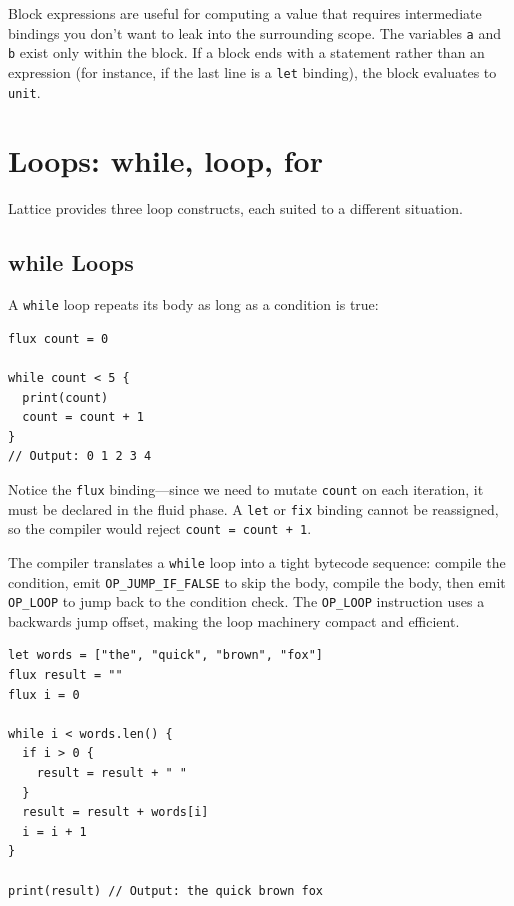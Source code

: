Block expressions are useful for computing a value that requires intermediate bindings you don't want to leak into the surrounding scope. The variables \lstinline|a| and \lstinline|b| exist only within the block. If a block ends with a statement rather than an expression (for instance, if the last line is a \lstinline|let| binding), the block evaluates to \lstinline|unit|.

\section{Loops: while, loop, for}\label{sec:loops}

Lattice provides three loop constructs, each suited to a different situation.

\subsection{while Loops}\label{sec:while-loops}

A \lstinline|while| loop repeats its body as long as a condition is true:

\begin{lstlisting}[language=Lattice, caption={Counting with while}]
flux count = 0

while count < 5 {
  print(count)
  count = count + 1
}
// Output: 0 1 2 3 4
\end{lstlisting}

Notice the \lstinline|flux| binding---since we need to mutate \lstinline|count| on each iteration, it must be declared in the fluid phase. A \lstinline|let| or \lstinline|fix| binding cannot be reassigned, so the compiler would reject \lstinline|count = count + 1|.

The compiler translates a \lstinline|while| loop into a tight bytecode sequence: compile the condition, emit \lstinline|OP_JUMP_IF_FALSE| to skip the body, compile the body, then emit \lstinline|OP_LOOP| to jump back to the condition check. The \lstinline|OP_LOOP| instruction uses a backwards jump offset, making the loop machinery compact and efficient.

\begin{lstlisting}[language=Lattice, caption={Building a string with while}]
let words = ["the", "quick", "brown", "fox"]
flux result = ""
flux i = 0

while i < words.len() {
  if i > 0 {
    result = result + " "
  }
  result = result + words[i]
  i = i + 1
}

print(result) // Output: the quick brown fox
\end{lstlisting}

